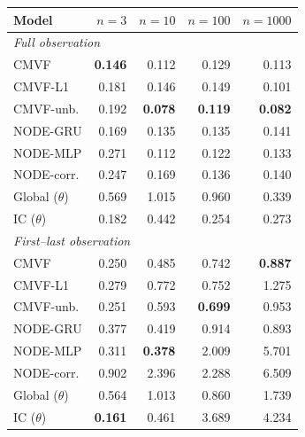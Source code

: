 \begin{tabular}{lrrrr}
\toprule
Model & $n{=}3$ & $n{=}10$ & $n{=}100$ & $n{=}1000$ \\
\midrule
\multicolumn{5}{l}{\emph{Full observation}} \\
CMVF & \textbf{0.146} & 0.112 & 0.129 & 0.113 \\
CMVF-L1 & 0.181 & 0.146 & 0.149 & 0.101 \\
CMVF-unb. & 0.192 & \textbf{0.078} & \textbf{0.119} & \textbf{0.082} \\
NODE-GRU & 0.169 & 0.135 & 0.135 & 0.141 \\
NODE-MLP & 0.271 & 0.112 & 0.122 & 0.133 \\
NODE-corr. & 0.247 & 0.169 & 0.136 & 0.140 \\
Global ($\theta$) & 0.569 & 1.015 & 0.960 & 0.339 \\
IC ($\theta$) & 0.182 & 0.442 & 0.254 & 0.273 \\
\midrule
\multicolumn{5}{l}{\emph{First--last observation}} \\
CMVF & 0.250 & 0.485 & 0.742 & \textbf{0.887} \\
CMVF-L1 & 0.279 & 0.772 & 0.752 & 1.275 \\
CMVF-unb. & 0.251 & 0.593 & \textbf{0.699} & 0.953 \\
NODE-GRU & 0.377 & 0.419 & 0.914 & 0.893 \\
NODE-MLP & 0.311 & \textbf{0.378} & 2.009 & 5.701 \\
NODE-corr. & 0.902 & 2.396 & 2.288 & 6.509 \\
Global ($\theta$) & 0.564 & 1.013 & 0.860 & 1.739 \\
IC ($\theta$) & \textbf{0.161} & 0.461 & 3.689 & 4.234 \\
\bottomrule
\end{tabular}
